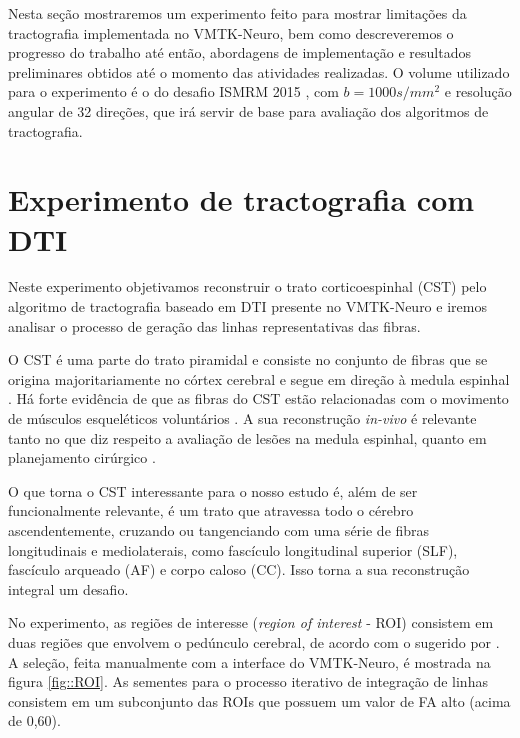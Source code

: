 \documentclass[
    12pt,                %
    oneside,            %
    a4paper,            %
    english,            %
    french,                %
    spanish,            %
    brazil                %
    ]{abntex2}
\begin{document}
Nesta seção mostraremos um experimento feito para mostrar limitações da tractografia implementada no VMTK-Neuro, bem como descreveremos o progresso do trabalho até então, abordagens de implementação e resultados preliminares obtidos até o momento das atividades realizadas. O volume utilizado para o experimento é o do desafio ISMRM 2015 \cite{TractometerTool}, com $b = 1000s/mm^2$ e resolução angular de 32 direções, que irá servir de base para avaliação dos algoritmos de tractografia.

\section{Experimento de tractografia com DTI}

Neste experimento objetivamos reconstruir o trato corticoespinhal (CST) pelo algoritmo de tractografia baseado em DTI presente no VMTK-Neuro e iremos analisar o processo de geração das linhas representativas das fibras.


O CST é uma parte do trato piramidal e consiste no conjunto de fibras que se origina majoritariamente no córtex cerebral e segue em direção à medula espinhal \cite{Kolb2015}. Há forte evidência de que as fibras do CST estão relacionadas com o movimento de músculos esqueléticos voluntários \cite{zhang2018}.
A sua reconstrução \textit{in-vivo} é relevante tanto no que diz respeito a avaliação de lesões na medula espinhal, quanto em planejamento cirúrgico \cite{zhang2018}.

O que torna o CST interessante para o nosso estudo é, além de ser funcionalmente relevante, é um trato que atravessa todo o cérebro ascendentemente, cruzando ou tangenciando com uma série de fibras longitudinais e mediolaterais, como fascículo longitudinal superior (SLF), fascículo arqueado (AF) e corpo caloso (CC). Isso torna a sua reconstrução integral um desafio.



No experimento, as regiões de interesse (\textit{region of interest} - ROI) consistem em duas regiões que envolvem o pedúnculo cerebral, de acordo com o sugerido por . A seleção, feita manualmente com a interface do VMTK-Neuro, é mostrada na figura \ref{fig::ROI}. As sementes para o processo iterativo de integração de linhas consistem em um subconjunto das ROIs que possuem um valor de FA alto (acima de 0,60).
\end{document}
